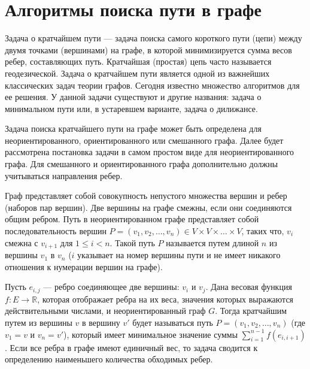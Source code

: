 \section{Алгоритмы поиска пути в графе}

Задача о кратчайшем пути --- задача поиска самого короткого пути (цепи) между двумя точками (вершинами) на графе, в которой минимизируется сумма весов ребер, составляющих путь.
Кратчайшая (простая) цепь часто называется геодезической. \cite{graph-harry}
Задача о кратчайшем пути является одной из важнейших классических задач теории графов. 
Сегодня известно множество алгоритмов для ее решения.
У данной задачи существуют и другие названия: задача о минимальном пути или, в устаревшем варианте, задача о дилижансе.

Задача поиска кратчайшего пути на графе может быть определена для неориентированного, ориентированного или смешанного графа. 
Далее будет рассмотрена постановка задачи в самом простом виде для неориентированного графа. 
Для смешанного и ориентированного графа дополнительно должны учитываться направления ребер.

Граф представляет собой совокупность непустого множества вершин и ребер (наборов пар вершин). 
Две вершины на графе смежны, если они соединяются общим ребром. 
Путь в неориентированном графе представляет собой последовательность вершин $P = (v_1, v_2, \dots, v_n) \in V\times V \times \dots \times V$, таких что, $v_i$ смежна с $v_{i+1}$ для $1\leqslant i < n$.
Такой путь $P$ называется путем длиной $n$ из вершины $v_1$ в $v_n$ ($i$ указывает на номер вершины пути и не имеет никакого отношения к нумерации вершин на графе).

Пусть $e_{i, j}$ --- ребро соединяющее две вершины: $v_i$ и $v_j$. 
Дана весовая функция $f: E \rightarrow \mathbb{R}$, которая отображает ребра на их веса, значения которых выражаются действительными числами, и неориентированный граф $G$. 
Тогда кратчайшим путем из вершины $v$ в вершину $v'$ будет называться путь $P = ( v_1, v_2, \ldots, v_n )$ (где $v_1 = v$ и $v_n = v'$), который имеет минимальное значение суммы $\sum_{i =1}^{n-1} f(e_{i, i+1})$. 
Если все ребра в графе имеют единичный вес, то задача сводится к определению наименьшего количества обходимых ребер. \cite{graph-evstigneev}

